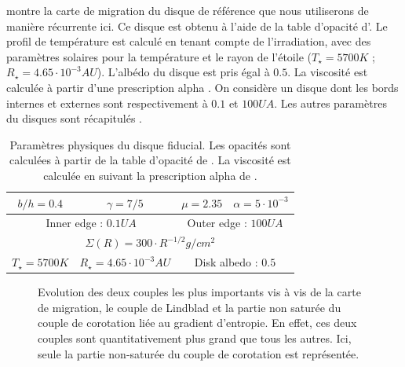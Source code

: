  montre la carte de migration du disque de référence que nous utiliserons de manière
récurrente ici. Ce disque est obtenu à l'aide de la table d'opacité d'\cite{hure2000transition}. Le profil de température est
calculé en tenant compte de l'irradiation, avec des paramètres solaires pour la température et le rayon de l'étoile ($T_\star =
5700\unit{K}$ ; $R_\star = 4.65\cdot 10^{-3}\unit{AU}$). L'albédo du disque est pris égal à $0.5$. La viscosité est calculée à
partir d'une prescription alpha \citep{shakura1973black}. On considère un disque dont les bords internes et externes sont
respectivement à $0.1$ et $100\unit{UA}$. Les autres paramètres du disques sont récapitulés . 

\begin{table}[htb]
\centering
\begin{tabular}{|c|c|c|c|}
\hline
$b/h = 0.4$ & $\gamma = 7/5$ & $\mu = 2.35$ & $\alpha = 5\cdot 10^{-3}$ \\\hline
\multicolumn{2}{|c|}{Inner edge : $0.1\unit{UA}$} & \multicolumn{2}{c|}{Outer edge : $100\unit{UA}$}\\\hline
\multicolumn{4}{|c|}{$\Sigma(R) = 300 \cdot R^{-1/2}\unit{g/cm^2}$}\\\hline
$T_\star = 5700\unit{K}$ & $R_\star = 4.65\cdot 10^{-3}\unit{AU}$ & \multicolumn{2}{c|}{Disk albedo : $0.5$}\\\hline
\end{tabular}
\caption{Paramètres physiques du disque fiducial. Les opacités sont calculées à partir de la table d'opacité de
\cite{hure2000transition}. La viscosité est calculée en suivant la prescription alpha de
\cite{shakura1973black}.}\label{tab:fiducial_parameters}
\end{table}

\begin{figure}[htb]
\centering
{}\hfill
{}

\caption{Evolution des deux couples les plus importants vis à vis de la carte de migration, le couple de Lindblad et la partie
non saturée du couple de corotation liée au gradient d'entropie. En effet, ces deux couples sont quantitativement plus grand que
tous les autres. Ici, seule la partie non-saturée du couple de corotation est représentée.}\label{fig:details_maps}
\end{figure}

